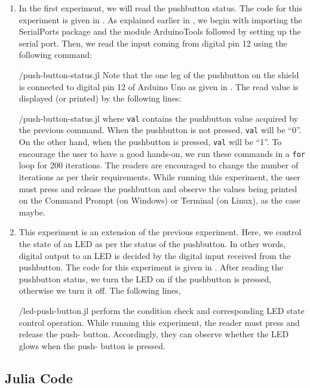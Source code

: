 \begin{enumerate}
\item In the first experiment, we will read the pushbutton status. 
The code for this experiment is given in . 
As explained earlier in , we begin with importing the SerialPorts 
\cite{julia-serial-ports} package and the module ArduinoTools followed by setting up the serial port.
Then, we read the input coming from digital pin 12 using the following
command: 

  {\LocPushjuliacode/push-button-status.jl}
  Note that the one leg of the pushbutton on the shield is connected to digital
pin 12 of Arduino Uno as given in . The read value is displayed (or
printed) by the following lines:

  {\LocPushjuliacode/push-button-status.jl} where {\tt val} contains the pushbutton value acquired by the previous command.
  When the pushbutton is not pressed, {\tt val} will be ``0''. On the other hand,
  when the pushbutton is pressed, {\tt val} will be ``1''. To encourage the user to have a good hands-on, we run these commands in a
{\tt for} loop for 200 iterations. The readers are encouraged to change the number
of iterations as per their requirements. While running this experiment, the user
must press and release the pushbutton and observe the values being printed
on the Command Prompt (on Windows) or Terminal (on Linux), as the case
maybe.

\item This experiment is an extension of the previous
  experiment. Here, we control the state of an LED as per the status
  of the pushbutton. In other words, digital output to an LED is
  decided by the digital input received from the pushbutton. The code
  for this experiment is given in . After reading
  the pushbutton status, we turn the LED on if the pushbutton is
  pressed, otherwise we turn it off. The following lines, 
  
  {\LocPushjuliacode/led-push-button.jl} perform the condition check
  and corresponding LED state control operation. While running this experiment, the reader must press and release the push-
  button. Accordingly, they can observe whether the LED glows when the push-
  button is pressed.
\end{enumerate}

\subsection{Julia Code}
\label{sec:push-julia-code}

